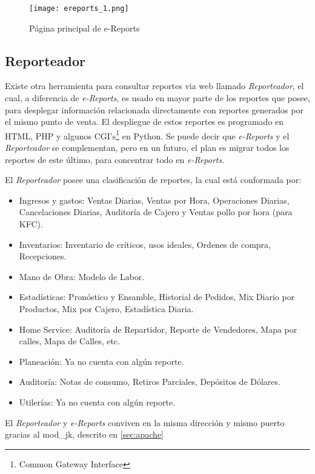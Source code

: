 \begin{figure}[htb]
 \begin{center}
  \texttt{[image: ereports\_1.png]}
 \end{center}
 \caption{Página principal de e-Reports}
 \label{fig:ereports}
\end{figure}

\subsection{Reporteador}
\label{sec:reporteador}

Existe otra herramienta para consultar reportes via web llamado \textit{Reporteador}, el cual, a diferencia de \textit{e-Reports}, es usado en mayor parte de los reportes que posee, para desplegar información relacionada directamente con reportes generados por el mismo punto de venta. El despliegue de estos reportes es programado en HTML, PHP y algunos CGI's\footnote{Common Gateway Interface} en Python. Se puede decir que \textit{e-Reports} y el \textit{Reporteador} se complementan, pero en un futuro, el plan es migrar todos los reportes de este último, para concentrar todo en \textit{e-Reports}.

El \textit{Reporteador} posee una clasificación de reportes, la cual está conformada por:

\begin{itemize}
 \item Ingresos y gastos: Ventas Diarias, Ventas por Hora, Operaciones Diarias, Cancelaciones Diarias, Auditoría de Cajero y Ventas pollo por hora (para KFC).
 \item Inventarios: Inventario de críticos, usos ideales, Ordenes de compra, Recepciones.
 \item Mano de Obra: Modelo de Labor.
 \item Estadísticas: Pronóstico y Ensamble, Historial de Pedidos, Mix Diario por Productos, Mix por Cajero, Estadística Diaria.
 \item Home Service: Auditoría de Repartidor, Reporte de Vendedores, Mapa por calles, Mapa de Calles, etc.
 \item Planeación: Ya no cuenta con algún reporte.
 \item Auditoría: Notas de consumo, Retiros Parciales, Depósitos de Dólares.
 \item Utilerías: Ya no cuenta con algún reporte.
\end{itemize}

El \textit{Reporteador} y \textit{e-Reports} conviven en la misma dirección y mismo puerto gracias al mod\_jk, descrito en \ref{sec:apache}


